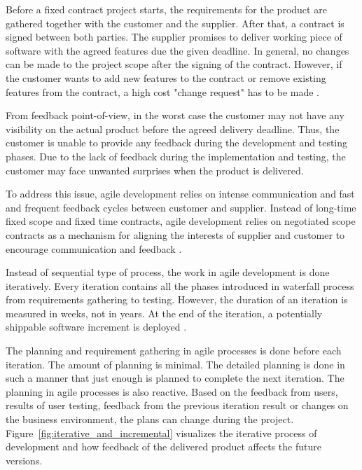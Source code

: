 \documentclass[english,12pt,a4paper,pdftex]{article}
\begin{document}
Before a fixed contract project starts, the requirements for the product are gathered together with the customer and the supplier. After that, a contract is signed between both parties. The supplier promises to deliver working piece of software with the agreed features due the given deadline. In general, no changes can be made to the project scope after the signing of the contract. However, if the customer wants to add new features to the contract or remove existing features from the contract, a high cost "change request" has to be made \citep{beck2004}. 

From feedback point-of-view, in the worst case the customer may not have any visibility on the actual product before the agreed delivery deadline. Thus, the customer is unable to provide any feedback during the development and testing phases. Due to the lack of feedback during the implementation and testing, the customer may face unwanted surprises when the product is delivered.

To address this issue, agile development relies on intense communication and fast and frequent feedback cycles between customer and supplier. Instead of long-time fixed scope and fixed time contracts, agile development relies on negotiated scope contracts as a mechanism for aligning the interests of supplier and customer to encourage communication and feedback \citep{beck2004}.

Instead of sequential type of process, the work in agile development is done iteratively. Every iteration contains all the phases introduced in waterfall process from requirements gathering to testing. However, the duration of an iteration is measured in weeks, not in years. At the end of the iteration, a potentially shippable software increment is deployed \citep{shore2007}.

The planning and requirement gathering in agile processes is done before each iteration. The amount of planning is minimal. The detailed planning is done in such a manner that just enough is planned to complete the next iteration. The planning in agile processes is also reactive. Based on the feedback from users, results of user testing, feedback from the previous iteration result or changes on the business environment, the plans can change during the project. Figure~\ref{fig:iterative_and_incremental} visualizes the iterative process of development and how feedback of the delivered product affects the future versions.
\end{document}
